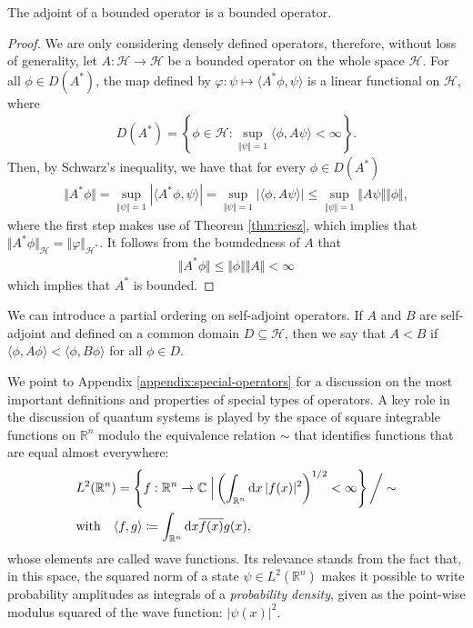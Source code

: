 \begin{proposition}
	The adjoint of a bounded operator is a bounded operator.
\end{proposition}
\begin{proof}
	We are only considering densely defined operators, therefore, without loss of generality,
	let $A:\mathcal{H}\to\mathcal{H}$ be a bounded operator on the whole space $\mathcal{H}$.
	For all $\phi\in D(A^*)$, the map defined by $\varphi:\psi\mapsto\langle A^*\phi,\psi \rangle$ is a linear
	functional on $\mathcal{H}$, where
	\begin{align*}
		D(A^*) = \left\{\phi\in\mathcal{H} : \sup_{\Vert\psi\Vert=1}\langle\phi,A\psi\rangle
		<\infty\right\}.
	\end{align*}
	Then, by Schwarz's inequality, we have that for every $\phi\in D(A^*)$
	\begin{align*}
		\Vert A^*\phi\Vert = \sup_{\Vert\psi\Vert=1}|\langle A^*\phi,\psi\rangle|
		= \sup_{\Vert\psi\Vert=1}|\langle\phi,A\psi\rangle|
		\leq \sup_{\Vert\psi\Vert=1}\Vert A\psi\Vert\Vert\phi\Vert,
	\end{align*}
	where the first step makes use of Theorem \ref{thm:riesz}, which implies that
	$\Vert A^*\phi\Vert_\mathcal{H}=\Vert\varphi\Vert_{\mathcal{H}^*}$. It follows from the
	boundedness of $A$ that
	\begin{align*}
		\Vert A^*\phi\Vert \leq \Vert\phi\Vert \Vert A\Vert < \infty
	\end{align*}
	which implies that $A^*$ is bounded.
\end{proof}

\begin{remark}
	We can introduce a partial ordering on self-adjoint operators. If $A$ and $B$ are
	self-adjoint and defined on a common domain $D\subseteq\mathcal{H}$, then we say that $A<B$
	if $\langle\phi,A\phi\rangle < \langle\phi,B\phi\rangle$ for all $\phi\in D$.
\end{remark}

We point to Appendix \ref{appendix:special-operators} for a discussion on the most important
definitions and properties of special types of operators. A key role in the discussion of
quantum systems is played by the space of square integrable functions on $\mathbb{R}^n$ modulo
the equivalence relation $\sim$ that identifies functions that are equal almost everywhere:
\begin{align*}
	&L^2(\mathbb{R}^n) = \left\{ f : \mathbb{R}^n \to \mathbb{C}
	\;\Big| \left(\int_{\mathbb{R}^n} \mathrm{d} x\, |f(x)|^2\right)^{1/2} < \infty \right\}\bigg/\sim \\
	&\mathrm{with}\quad\langle f,g\rangle \coloneq \int_{\mathbb{R}^n}\mathrm{d} x \overline{f(x)}g(x),
\end{align*}
whose elements are called wave functions. Its relevance stands from the fact that, in
this space, the squared norm of a state $\psi\in L^2(\mathbb{R}^n)$ makes it possible to write
probability amplitudes as integrals of a \textit{probability density}, given as the point-wise
modulus squared of the wave function: $\vert\psi(x)\vert^2$.

